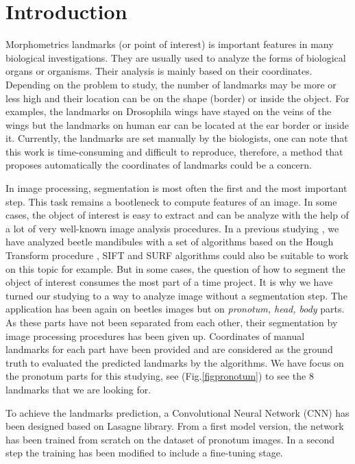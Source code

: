 \documentclass[10pt]{article}
\begin{document}
\section{Introduction}
Morphometrics landmarks (or point of interest) is important features
in many biological investigations. They are  usually used to analyze
the forms of biological organs or organisms. Their analysis is mainly
based on their coordinates. Depending on the problem to study, the number of
landmarks may be more or less high and  their location  can
be on the shape (border) or inside the object. For
  examples, the landmarks on Drosophila wings \cite{drosophilaWings} have stayed on the
veins of the wings but the landmarks on human ear \cite{cintas2016automatic} can be located at
the ear border or inside it. Currently, the landmarks are set manually by
the biologists, one can note that this work is time-consuming and difficult to
reproduce, therefore, a method that proposes automatically the
coordinates of landmarks could be a concern.

In image processing, segmentation is most often the first and the most
important step. This task remains a bootleneck to compute features of
an image. In some cases, the object of interest is easy to extract and
can be analyze with the help of a lot of very well-known image
analysis procedures. In a previous studying \cite{le2017maelab}, we have analyzed beetle
mandibules with a set of algorithms based on the Hough Transform
procedure \cite{palaniswamy2010automatic}, SIFT
\cite{lowe2004distinctive} and SURF \cite{bay2006surf} algorithms could also be
suitable to work on this topic for example. But in some cases, the question of how to segment the
object of interest consumes the most part of a time project. It is why
we have turned our studying to a way to analyze image without a
segmentation step. The application has been again on beetles images
but on \textit{pronotum, head, body} parts. As these parts have not
been separated from each other, their segmentation by image processing
procedures has been given up. Coordinates of manual landmarks for each part
have been provided and are considered as the ground
truth to evaluated the predicted landmarks by the algorithms. We have focus on the
pronotum parts for this studying, see (Fig.\ref{figpronotum}) to see
the $8$ landmarks that we are looking for.


To achieve the landmarks prediction, a Convolutional Neural Network
(CNN)\cite{lecun2010convolutional} has been designed based on Lasagne
library\cite{lasagne}. From a first model version, the network has been
trained from scratch on the dataset of pronotum images. In a second
step the training has been modified to include a fine-tuning
\cite{yosinski2014transferable} stage.
\end{document}
